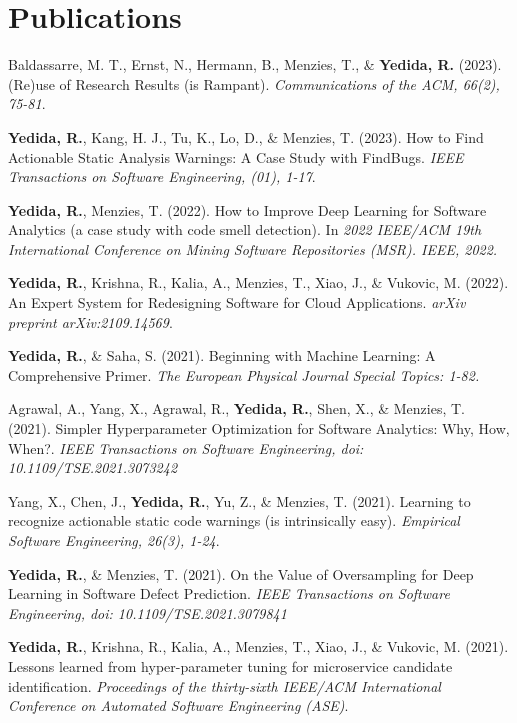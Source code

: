 \section{Publications}
 \resumeSubHeadingListStart
    \item
      {Baldassarre, M. T., Ernst, N., Hermann, B., Menzies, T., \& \textbf{Yedida, R.} (2023). (Re)use of Research Results (is Rampant). \textit{Communications of the ACM, 66(2), 75-81}.
      }
    \item
      {\textbf{Yedida, R.}, Kang, H. J., Tu, K., Lo, D., \& Menzies, T. (2023). How to Find Actionable Static Analysis Warnings: A Case Study with FindBugs. \textit{IEEE Transactions on Software Engineering, (01), 1-17}.}
    \item
      {\textbf{Yedida, R.}, Menzies, T. (2022). How to Improve Deep Learning for Software Analytics (a case study with code smell detection). In \textit{2022 IEEE/ACM 19th International Conference on Mining Software Repositories (MSR). IEEE, 2022.}}
    \item
      {\textbf{Yedida, R.}, Krishna, R., Kalia, A., Menzies, T., Xiao, J., \& Vukovic, M. (2022). An Expert System for Redesigning Software for Cloud Applications. \textit{arXiv preprint arXiv:2109.14569}.}
    \item
      {\textbf{Yedida, R.}, \& Saha, S. (2021). Beginning with Machine Learning: A Comprehensive Primer. \textit{The European Physical Journal Special Topics: 1-82.}}
    \item
      {Agrawal, A., Yang, X., Agrawal, R., \textbf{Yedida, R.}, Shen, X., \& Menzies, T. (2021). Simpler Hyperparameter Optimization for Software Analytics: Why, How, When?. \textit{IEEE Transactions on Software Engineering, doi: 10.1109/TSE.2021.3073242}}
    \item
      {Yang, X., Chen, J., \textbf{Yedida, R.}, Yu, Z., \& Menzies, T. (2021). Learning to recognize actionable static code warnings (is intrinsically easy). \textit{Empirical Software Engineering, 26(3), 1-24}.}
    \item
      {\textbf{Yedida, R.}, \& Menzies, T. (2021). On the Value of Oversampling for Deep Learning in Software Defect Prediction. \textit{IEEE Transactions on Software Engineering, doi: 10.1109/TSE.2021.3079841}}
    \item
      {\textbf{Yedida, R.}, Krishna, R., Kalia, A., Menzies, T., Xiao, J., \& Vukovic, M. (2021). Lessons learned from hyper-parameter tuning for microservice candidate identification. \textit{Proceedings of the thirty-sixth IEEE/ACM International Conference on Automated Software Engineering (ASE)}.
      }
